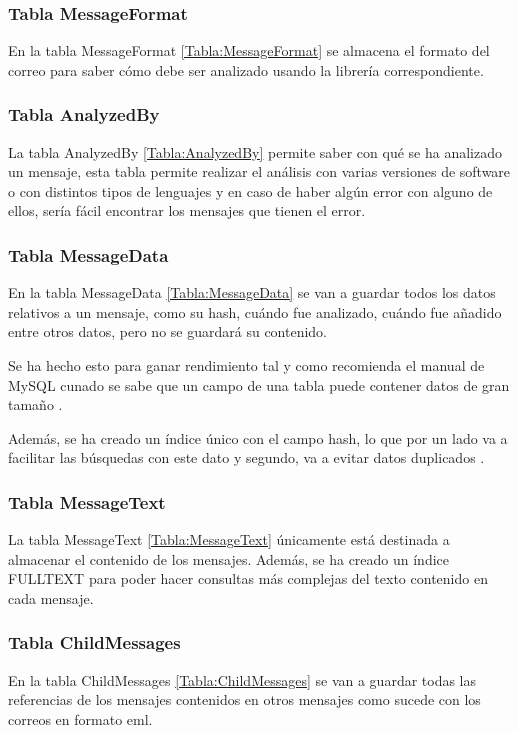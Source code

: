 \subsubsection{Tabla MessageFormat}
En la tabla MessageFormat \ref{Tabla:MessageFormat} se almacena el formato del correo para saber cómo debe ser analizado usando la librería correspondiente. 

\subsubsection{Tabla AnalyzedBy}
La tabla AnalyzedBy \ref{Tabla:AnalyzedBy} permite saber con qué se ha analizado un mensaje, esta tabla permite realizar el análisis con varias versiones de software o con distintos tipos de lenguajes y en caso de haber algún error con alguno de ellos, sería fácil encontrar los mensajes que tienen el error. 

\subsubsection{Tabla MessageData}
En la tabla MessageData \ref{Tabla:MessageData} se van a guardar todos los datos relativos a un mensaje, como su hash, cuándo fue analizado, cuándo fue añadido entre otros datos, pero no se guardará su contenido.

Se ha hecho esto para ganar rendimiento tal y como recomienda el manual de MySQL cunado se sabe que un campo de una tabla puede contener datos de gran tamaño \cite{mysql_optimize_blob}. 

Además, se ha creado un índice único con el campo hash, lo que por un lado va a facilitar las búsquedas con este dato y segundo, va a evitar datos duplicados \cite{mysql_unique_index}. 

\subsubsection{Tabla MessageText}
La tabla MessageText \ref{Tabla:MessageText} únicamente está destinada a almacenar el contenido de los mensajes. Además, se ha creado un índice FULLTEXT \cite{mysql_fulltext} para poder hacer consultas más complejas del texto contenido en cada mensaje. 

\subsubsection{Tabla ChildMessages}
En la tabla ChildMessages \ref{Tabla:ChildMessages} se van a guardar todas las referencias de los mensajes contenidos en otros mensajes como sucede con los correos en formato eml. 


